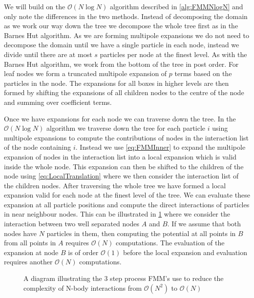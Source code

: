 We will build on the $\mathcal{O}(N\log N)$ algorithm described in \cref{alg:FMMNlogN} and only note the differences in the two methods. Instead of decomposing the domain as we work our way down the tree we decompose the whole tree first as in the Barnes Hut algorithm. As we are forming multipole expansions we do not need to decompose the domain until we have a single particle in each node, instead we divide until there are at most $s$ particles per node at the finest level. As with the Barnes Hut algorithm, we work from the bottom of the tree in post order. For leaf nodes we form a truncated multipole expansion of $p$ terms based on the particles in the node. The expansions for all boxes in higher levels are then formed by shifting the expansions of all children nodes to the centre of the node and summing over coefficient terms.

Once we have expansions for each node we can traverse down the tree.
In the $\mathcal{O}(N\log N)$ algorithm we traverse down the tree for each particle $i$ using multipole expansions to compute the contributions of nodes in the interaction list of the node containing $i$. Instead we use \cref{eq:FMMInner} to expand the multipole expansion of nodes in the interaction list into a local expansion which is valid inside the whole node. This expansion can then be shifted to the children of the node using  \ref{eq:LocalTranslation} where we then consider the interaction list of the children nodes.  After traversing the whole tree we have formed a local expansion valid for each node at the finest level of the tree. We can evaluate these expansion at all particle positions and compute the direct interactions of particles in near neighbour nodes. This can be illustrated in \cref{fig:3Step} where we consider the interaction between two well separated nodes $A$ and $B$. If we assume that both nodes have $N$ particles in them, then computing the potential at all points in $B$ from all points in $A$ requires $\mathcal{O}(N)$ computations. The evaluation of the expansion at node $B$ is of order $\mathcal{O}(1)$ before the local expansion and evaluation requires another $\mathcal{O}(N)$ computations.

\begin{figure}
    \centering
        \resizebox{.6\linewidth}{!}{}
    \caption{A diagram illustrating the 3 step process FMM's use to reduce the complexity of N-body interactions from $\mathcal{O}(N^2)$ to $\mathcal{O}(N)$}
    \label{fig:3Step}
\end{figure}

